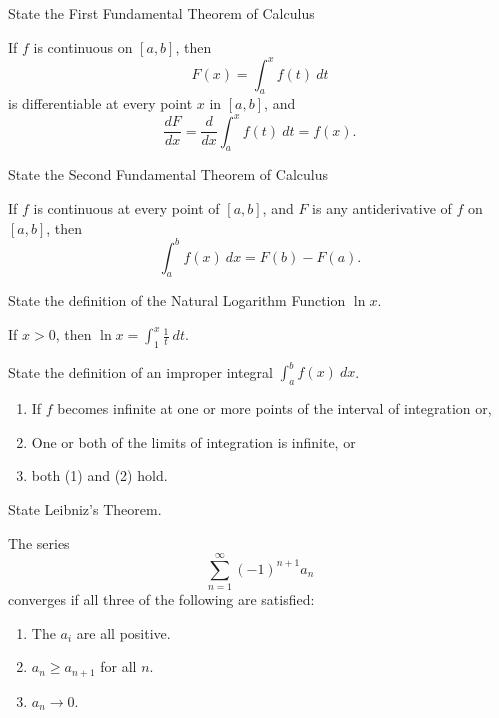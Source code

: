\begin{questions}
    \question[1] State the First Fundamental Theorem of Calculus
    \begin{solution}
        \begin{theorem}
            If $f$ is continuous on $[a, b]$, then
            $$F(x) = \int_a^x f(t)\ dt$$
            is differentiable at every point $x$ in $[a, b]$, and
            $$\frac{dF}{dx} = \frac{d}{dx} \int_a^x f(t)\ dt = f(x).$$
        \end{theorem}
    \end{solution}

    \question[1] State the Second Fundamental Theorem of Calculus
    \begin{solution}
        \begin{theorem}
            If $f$ is continuous at every point of $[a, b]$, and $F$
            is any antiderivative of $f$ on $[a, b]$, then
            $$\int_a^b f(x)\ dx = F(b) - F(a).$$
        \end{theorem}
    \end{solution}

    \question[1] State the definition of the Natural Logarithm
    Function $\ln x$.
    \begin{solution}
        \begin{definition}
            If $x > 0$, then $\ln x = \int_1^x \frac{1}{t}\ dt.$
        \end{definition}
    \end{solution}

    \question[1] State the definition of an improper integral
    $\int_a^b f(x)\ dx$.
    \begin{solution}
        \begin{definition}
            \begin{enumerate}
            \item If $f$ becomes infinite at one or more points of the
                interval of integration or,  
            \item One or both of the limits of integration is
                infinite, or
            \item both (1) and (2) hold.
            \end{enumerate}
        \end{definition}
    \end{solution}

    \question[1] State Leibniz's Theorem.
    \begin{solution}
        The series 
        $$\sum_{n=1}^\infty (-1)^{n+1} a_n$$
        converges if all three of the following are satisfied:
        \begin{enumerate}
        \item The $a_i$ are all positive.
        \item $a_n \ge a_{n+1}$ for all $n$.
        \item $a_n \to 0.$
        \end{enumerate}
    \end{solution}


\end{questions}
